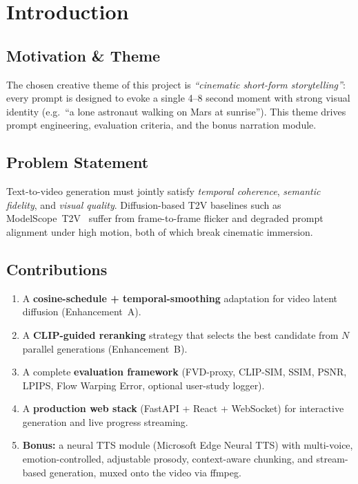 \documentclass[conference]{IEEEtran}
\begin{document}
\section{Introduction}

\subsection{Motivation \& Theme}
The chosen creative theme of this project is
\emph{``cinematic short-form storytelling''}: every prompt is
designed to evoke a single 4--8 second moment with strong visual
identity (e.g.~``a lone astronaut walking on Mars at sunrise'').
This theme drives prompt engineering, evaluation criteria, and
the bonus narration module.

\subsection{Problem Statement}
Text-to-video generation must jointly satisfy
\textit{temporal coherence}, \textit{semantic fidelity}, and
\textit{visual quality}. Diffusion-based T2V baselines such as
ModelScope~T2V~\cite{modelscope2023} suffer from frame-to-frame
flicker and degraded prompt alignment under high motion, both of
which break cinematic immersion.

\subsection{Contributions}
\begin{enumerate}
  \item A \textbf{cosine-schedule + temporal-smoothing} adaptation
        for video latent diffusion (Enhancement~A).
  \item A \textbf{CLIP-guided reranking} strategy that selects the
        best candidate from $N$ parallel generations (Enhancement~B).
  \item A complete \textbf{evaluation framework} (FVD-proxy,
        CLIP-SIM, SSIM, PSNR, LPIPS, Flow Warping Error, optional
        user-study logger).
  \item A \textbf{production web stack} (FastAPI + React + WebSocket)
        for interactive generation and live progress streaming.
  \item \textbf{Bonus:} a neural TTS module (Microsoft Edge Neural
        TTS) with multi-voice, emotion-controlled, adjustable
        prosody, context-aware chunking, and stream-based generation,
        muxed onto the video via ffmpeg.
\end{enumerate}
\end{document}
